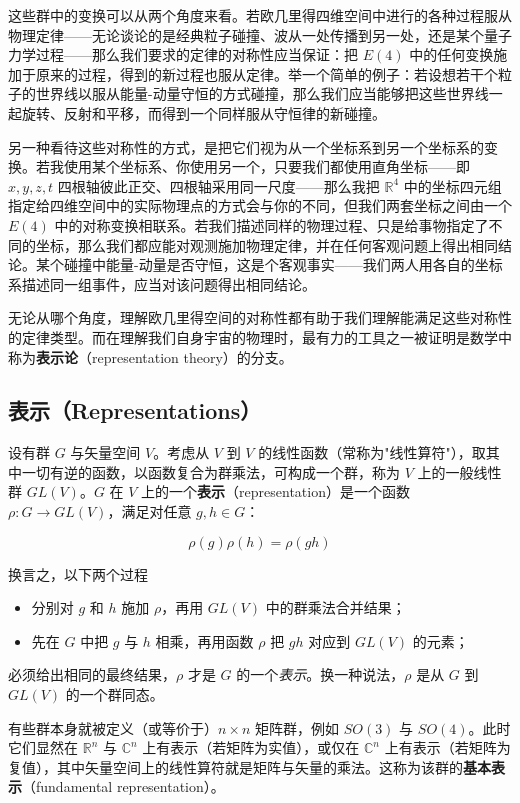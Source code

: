 这些群中的变换可以从两个角度来看。若欧几里得四维空间中进行的各种过程服从物理定律——无论谈论的是经典粒子碰撞、波从一处传播到另一处，还是某个量子力学过程——那么我们要求的定律的对称性应当保证：把 $E(4)$ 中的任何变换施加于原来的过程，得到的新过程也服从定律。举一个简单的例子：若设想若干个粒子的世界线以服从能量-动量守恒的方式碰撞，那么我们应当能够把这些世界线一起旋转、反射和平移，而得到一个同样服从守恒律的新碰撞。

另一种看待这些对称性的方式，是把它们视为从一个坐标系到另一个坐标系的变换。若我使用某个坐标系、你使用另一个，只要我们都使用直角坐标——即 $x,y,z,t$ 四根轴彼此正交、四根轴采用同一尺度——那么我把 $\mathbb{R}^{4}$ 中的坐标四元组指定给四维空间中的实际物理点的方式会与你的不同，但我们两套坐标之间由一个 $E(4)$ 中的对称变换相联系。若我们描述同样的物理过程、只是给事物指定了不同的坐标，那么我们都应能对观测施加物理定律，并在任何客观问题上得出相同结论。某个碰撞中能量-动量是否守恒，这是个客观事实——我们两人用各自的坐标系描述同一组事件，应当对该问题得出相同结论。

无论从哪个角度，理解欧几里得空间的对称性都有助于我们理解能满足这些对称性的定律类型。而在理解我们自身宇宙的物理时，最有力的工具之一被证明是数学中称为\textbf{表示论}（representation theory）的分支。

\subsection{表示（Representations）}

设有群 $G$ 与矢量空间 $V$。考虑从 $V$ 到 $V$ 的线性函数（常称为"线性算符"），取其中一切有逆的函数，以函数复合为群乘法，可构成一个群，称为 $V$ 上的一般线性群 $GL(V)$。$G$ 在 $V$ 上的一个\textbf{表示}（representation）是一个函数 $\rho:G\to GL(V)$，满足对任意 $g,h\in G$：

\[
\rho(g)\rho(h)=\rho(gh)
\]

换言之，以下两个过程

\begin{itemize}
  \item 分别对 $g$ 和 $h$ 施加 $\rho$，再用 $GL(V)$ 中的群乘法合并结果；
  \item 先在 $G$ 中把 $g$ 与 $h$ 相乘，再用函数 $\rho$ 把 $gh$ 对应到 $GL(V)$ 的元素；
\end{itemize}

必须给出相同的最终结果，$\rho$ 才是 $G$ 的一个\emph{表示}。换一种说法，$\rho$ 是从 $G$ 到 $GL(V)$ 的一个群同态。

有些群本身就被定义（或等价于）$n\times n$ 矩阵群，例如 $SO(3)$ 与 $SO(4)$。此时它们显然在 $\mathbb{R}^{n}$ 与 $\mathbb{C}^{n}$ 上有表示（若矩阵为实值），或仅在 $\mathbb{C}^{n}$ 上有表示（若矩阵为复值），其中矢量空间上的线性算符就是矩阵与矢量的乘法。这称为该群的\textbf{基本表示}（fundamental representation）。

